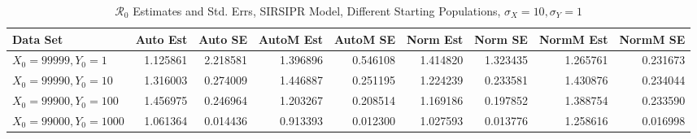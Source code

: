 \documentclass[12pt]{article}
\newcommand{\rr}{\ensuremath{\mathcal{R}_0}}
\begin{document}
\begin{table}[H]
	
	\caption{$\rr$ Estimates and Std. Errs, SIRSIPR Model,
		Different Starting Populations, 
		$\sigma_X = 10, \sigma_Y = 1$}
	\begin{footnotesize}
		\hskip -1.7cm
		\begin{tabular}{l|r|r|r|r|r|r|r|r}
			\hline
			Data Set & Auto Est & Auto SE & AutoM Est & AutoM SE & Norm Est & Norm SE & NormM Est & NormM SE\\
			\hline
			$X_0 = 99999, Y_0 = 1$ & 1.125861 & 2.218581 & 1.396896 & 0.546108 & 1.414820 & 1.323435 & 1.265761 & 0.231673\\
			\hline
			$X_0 = 99990, Y_0 = 10$ & 1.316003 & 0.274009 & 1.446887 & 0.251195 & 1.224239 & 0.233581 & 1.430876 & 0.234044\\
			\hline
			$X_0 = 99900, Y_0 = 100$ & 1.456975 & 0.246964 & 1.203267 & 0.208514 & 1.169186 & 0.197852 & 1.388754 & 0.233590\\
			\hline
			$X_0 = 99000, Y_0 = 1000$ & 1.061364 & 0.014436 & 0.913393 & 0.012300 & 1.027593 & 0.013776 & 1.258616 & 0.016998\\
			\hline
		\end{tabular}
	\end{footnotesize}
\end{table}
\end{document}

